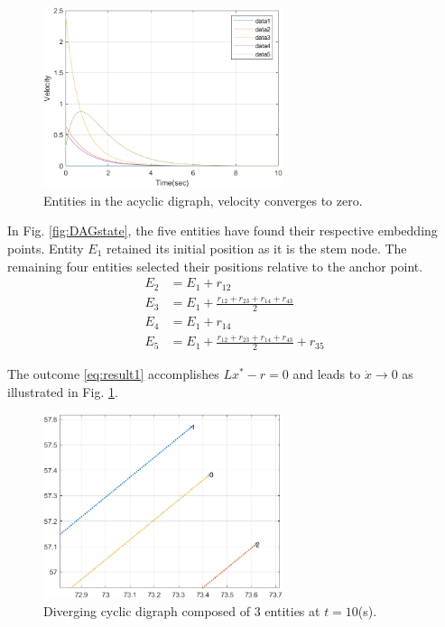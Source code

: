 \documentclass[letterpaper, 10 pt, conference]{ieeeconf}  %
\begin{document}
\begin{figure}[thb]
\begin{center}
\includegraphics[width=7cm]{IMG/DAGvelocity.png}
\caption{Entities in the acyclic digraph, velocity converges to zero.}
\label{fig:DAGvelocity}
\end{center}
\vspace{-0mm}
\end{figure}

In Fig. \ref{fig:DAGstate}, the five entities have found their respective embedding points. Entity \(E_1\) retained its initial position as it is the stem node. The remaining four entities selected their positions relative to the anchor point.
\begin{equation}\label{eq:result1}
\begin{split}
    E_2 &= E_1 + r_{12}\\
    E_3 &= E_1 + \frac{r_{12}+r_{23}+r_{14}+r_{43}}{2}\\
    E_4 &= E_1 + r_{14}\\
    E_5 &= E_1 + \frac{r_{12}+r_{23}+r_{14}+r_{43}}{2} + r_{35}
\end{split}
\end{equation}

The outcome \eqref{eq:result1} accomplishes $Lx^* - r = 0$ and leads to $\dot{x} \rightarrow 0$ as illustrated in Fig. \ref{fig:DAGvelocity}. 

\begin{figure}[thb]
\begin{center}
\includegraphics[width=7cm]{IMG/CG_simul3.png}
\caption{Diverging cyclic digraph composed of 3 entities at $t=10$(s).}
\label{fig:DCGstate}
\end{center}
\vspace{-3mm}
\end{figure}
\end{document}
